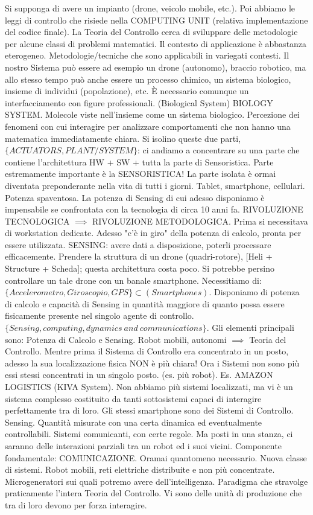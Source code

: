 Si supponga di avere un impianto (drone, veicolo mobile, etc.). Poi abbiamo le leggi di controllo che risiede nella COMPUTING UNIT (relativa implementazione del codice finale). La Teoria del Controllo cerca di sviluppare delle metodologie per alcune classi di problemi matematici. Il contesto di applicazione è abbastanza eterogeneo. Metodologie/tecniche che sono applicabili in variegati contesti. Il nostro Sistema può essere ad esempio un drone (autonomo), braccio robotico, ma allo stesso tempo può anche essere un processo chimico, un sistema biologico, insieme di individui (popolazione), etc. \`E necessario comunque un interfacciamento con figure professionali. (Biological System) BIOLOGY SYSTEM. Molecole viste nell'insieme come un sistema biologico. Percezione dei fenomeni con cui interagire per analizzare comportamenti che non hanno una matematica immediatamente chiara. Si isolino queste due parti, $\{ACTUATORS, PLANT/SYSTEM\}$: ci andiamo a concentrare su una parte che contiene l'architettura HW + SW + tutta la parte di Sensoristica. Parte estremamente importante è la SENSORISTICA! La parte isolata è ormai diventata preponderante nella vita di tutti i giorni. Tablet, smartphone, cellulari. Potenza spaventosa. La potenza di Sensing di cui adesso disponiamo è impensabile se confrontata con la tecnologia di circa 10 anni fa. RIVOLUZIONE TECNOLOGICA $\implies$ RIVOLUZIONE METODOLOGICA. Prima si necessitava di workstation dedicate. Adesso "c'è in giro" della potenza di calcolo, pronta per essere utilizzata. SENSING: avere dati a disposizione, poterli processare efficacemente. Prendere la struttura di un drone (quadri-rotore), [Heli + Structure + Scheda]; questa architettura costa poco. Si potrebbe persino controllare un tale drone con un banale smartphone. Necessitiamo di: $\{Accelerometro, Giroscopio, GPS\} \subset (Smartphones)$. Disponiamo di potenza di calcolo e capacità di Sensing in quantità maggiore di quanto possa essere fisicamente presente nel singolo agente di controllo. $\{Sensing, computing, dynamics\ and\ communications\}$. Gli elementi principali sono: Potenza di Calcolo e Sensing. Robot mobili, autonomi $\implies$ Teoria del Controllo. Mentre prima il Sistema di Controllo era concentrato in un posto, adesso la sua localizzazione fisica NON è più chiara! Ora i Sistemi non sono più essi stessi concentrati in un singolo posto. (es. più robot). Es. AMAZON LOGISTICS (KIVA System). Non abbiamo più sistemi localizzati, ma vi è un sistema complesso costituito da tanti sottosistemi capaci di interagire perfettamente tra di loro. Gli stessi smartphone sono dei Sistemi di Controllo. Sensing. Quantità misurate con una certa dinamica ed eventualmente controllabili. Sistemi comunicanti, con certe regole. Ma posti in una stanza, ci saranno delle interazioni parziali tra un robot ed i suoi vicini. Componente fondamentale: COMUNICAZIONE. Oramai quantomeno necessario. Nuova classe di sistemi. Robot mobili, reti elettriche distribuite e non più concentrate. Microgeneratori sui quali potremo avere dell'intelligenza. Paradigma che stravolge praticamente l'intera Teoria del Controllo. Vi sono delle unità di produzione che tra di loro devono per forza interagire.
